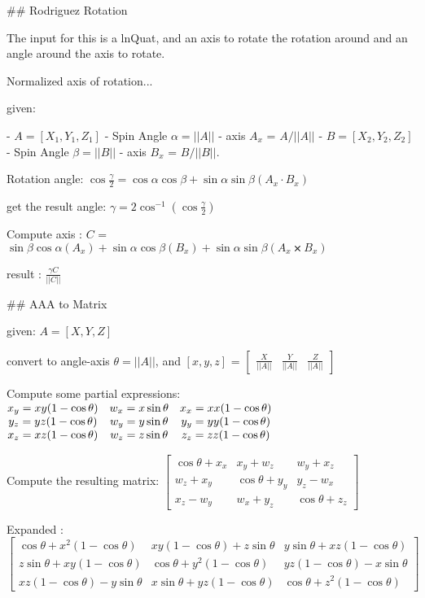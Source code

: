 ## Rodriguez Rotation

The input for this is a lnQuat, and an axis to rotate the rotation around and an angle around the axis to rotate.

Normalized axis of rotation...

given: 

- ${A} = [X_1, Y_1 ,Z_1] $   
  - Spin Angle $\alpha = ||A||$
  - axis $A_x$ = $A/||A||$
- ${B} = [X_2, Y_2 ,Z_2] $  
  - Spin Angle $\beta = ||B||$
  - axis $B_x$ = $B/||B||$.

Rotation angle: $\cos \frac{\gamma}{2} = \cos \alpha   \cos \beta  + \sin \alpha    \sin \beta  (  A_x \cdot B_x )$

get the result angle: $ \gamma = 2 \cos^{-1}( \cos \frac {\gamma}{2} )$


Compute axis : $C$ = $  \sin \beta  \cos \alpha  (A_x)  + \sin \alpha  \cos \beta (B_x) + \sin \alpha \sin \beta  ( A_x ⨯ B_x ) $

result : $\frac {\gamma C} {||C||}$



## AAA to Matrix

given: ${A} = [X, Y ,Z] $

convert to angle-axis  $ \theta = ||A|| $, and $[x,y,z]$ = $\begin{bmatrix} \frac {X} {||A||} & \frac {Y} {||A||} &  \frac {Z} {||A||} \end{bmatrix} $


Compute some partial expressions:$\begin{matrix}
   x_y = xy(1-\cos \theta) &   w_x = x\sin \theta  &  x_x = xx(1-\cos \theta) \\
   y_z = yz(1-\cos \theta) &    w_y = y\sin \theta &  y_y = yy(1-\cos \theta) \\
   x_z = xz(1-\cos \theta) &    w_z = z\sin \theta &  z_z = zz(1-\cos \theta) 
\end{matrix}\\$


Compute the resulting matrix: $\begin{bmatrix}
\cos \theta+x_x &  x_y + w_z      & w_y + x_z \\
 w_z + x_y      & \cos \theta+y_y & y_z - w_x \\
 x_z - w_y      &  w_x + y_z      & \cos \theta+z_z
\end{bmatrix} $
 

Expanded : $    \begin{bmatrix}
\cos \theta+x^2 (1-\cos \theta)     &   xy(1-\cos \theta) + z\sin \theta & y\sin \theta + xz(1-\cos \theta) \\
 z\sin \theta + xy(1-\cos \theta)   & \cos \theta+y^2 (1-\cos \theta)    & yz(1-\cos \theta) - x\sin \theta \\
xz(1-\cos \theta) - y\sin \theta    &  x\sin \theta + yz(1-\cos \theta)  & \cos \theta+z^{2}(1-\cos \theta)
\end{bmatrix} $




